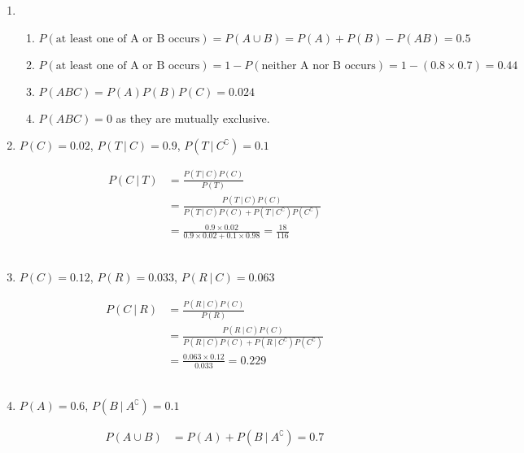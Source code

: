 \begin{enumerate}
	\item \begin{enumerate}
		\item $ P(\text{at least one of A or B occurs}) = P(A \cup B) = P(A) + P(B) - P(AB) = 0.5$\\
		
		\item $ P(\text{at least one of A or B occurs}) = 1 - P(\text{neither A nor B occurs}) = 1 - (0.8 \times 0.7) = 0.44$ \\
		
		\item $ P(ABC) = P(A) P(B) P(C) = 0.024 $\\
		
		\item $ P(ABC) = 0 $ as they are mutually exclusive.\\
		
	\end{enumerate}
	
	\item $ P(C) = 0.02 $, $ P(T\ |\ C) = 0.9 $, $ P(T\ |\ C^\complement) = 0.1 $
	
	\begin{align}
		P(C\ |\ T) &= \frac{P(T\ |\ C)P(C)}{P(T)} \\
		&= \frac{P(T\ |\ C)P(C)}{P(T\ |\ C)P(C) + P(T\ |\ C^\complement)P(C^\complement)} \\
		&= \frac{0.9 \times 0.02}{0.9 \times 0.02 + 0.1 \times 0.98} = \frac{18}{116}
	\end{align} \\
	
	\item $ P(C) = 0.12 $, $ P(R) = 0.033 $, $ P(R\ |\ C) = 0.063 $
	
	\begin{align}
		P(C\ |\ R) &= \frac{P(R\ |\ C)P(C)}{P(R)} \\
		&= \frac{P(R\ |\ C)P(C)}{P(R\ |\ C)P(C) + P(R\ |\ C^\complement)P(C^\complement)} \\
		&= \frac{0.063 \times 0.12}{0.033} = 0.229
	\end{align} \\ 
	
	
	\item $ P(A) = 0.6 $, $ P(B\ |\ A^\complement) = 0.1 $
	
	\begin{align}
		P(A \cup B) &= P(A) + P(B\ |\ A^\complement) = 0.7
	\end{align} \\ 
	

\end{enumerate}
